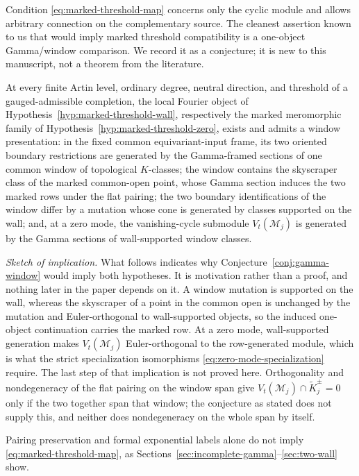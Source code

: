 Condition \eqref{eq:marked-threshold-map} concerns only the cyclic module and
allows arbitrary
connection on the complementary source.  The cleanest assertion known to us
that would imply marked threshold compatibility is a one-object Gamma/window
comparison.  We record it as a conjecture; it is new to this manuscript, not
a theorem from the literature.

\begin{conjecture}
\label{conj:gamma-window}
At every finite Artin level, ordinary degree, neutral direction, and
threshold of a gauged-admissible completion, the local Fourier object of
Hypothesis~\ref{hyp:marked-threshold-wall}, respectively the marked
meromorphic family of Hypothesis~\ref{hyp:marked-threshold-zero}, exists and
admits a window presentation: in the fixed common equivariant-input frame,
its two oriented boundary restrictions are generated by the Gamma-framed
sections of one common window of topological \(K\)-classes; the window
contains the skyscraper class of the marked common-open point, whose Gamma
section induces the two marked rows under the flat pairing; the two boundary
identifications of the window differ by a mutation whose cone is generated
by classes supported on the wall; and, at a zero mode, the vanishing-cycle
submodule \(V_t(\mathcal M_j)\) is generated by the Gamma sections of
wall-supported window classes.
\end{conjecture}

\smallskip
\noindent\emph{Sketch of implication.}  What follows indicates why
Conjecture~\ref{conj:gamma-window} would imply both hypotheses.  It is
motivation rather than a proof, and nothing later in the paper depends on
it.  A window
mutation is supported on the wall, whereas the skyscraper of a point in the
common open is unchanged by the mutation and Euler-orthogonal to
wall-supported objects, so the induced one-object continuation carries the
marked row.  At a zero mode, wall-supported generation makes
\(V_t(\mathcal M_j)\) Euler-orthogonal to the row-generated module, which is
what the strict specialization isomorphisms
\eqref{eq:zero-mode-specialization} require.  The last step of that
implication is not proved here.  Orthogonality and nondegeneracy of the flat
pairing on the window span give
\(V_t(\mathcal M_j)\cap\widetilde K_j^\pm=0\) only if the two together span
that window; the conjecture as stated does not supply this, and neither does
nondegeneracy on the whole span by itself.
\smallskip

Pairing preservation and formal exponential labels alone do not
imply \eqref{eq:marked-threshold-map}, as
Sections~\ref{sec:incomplete-gamma}--\ref{sec:two-wall}
show.

